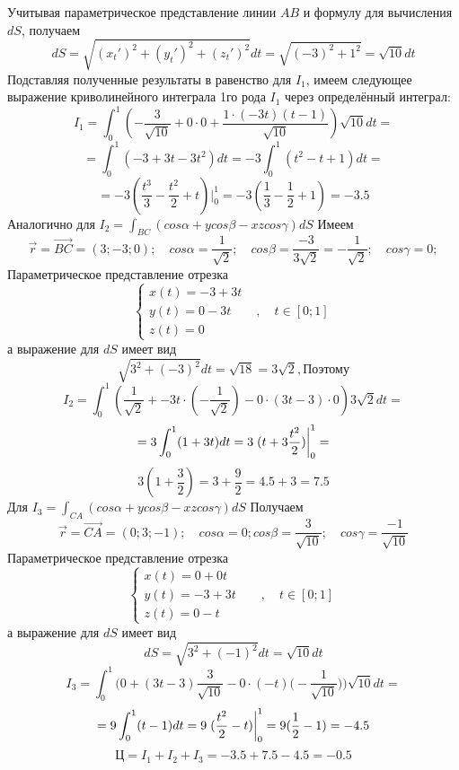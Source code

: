 \documentclass[11pt]{article}
\begin{document}
Учитывая параметрическое представление линии $AB$ и формулу для вычисления $dS$, получаем
\[dS = \sqrt{(x_t')^2 + (y_t')^2 + (z_t ')^2}dt = \sqrt{(-3)^2 + 1^2} = \sqrt{10}dt\]
Подставляя полученные результаты в равенство для $I_1$, имеем следующее выражение криволинейного интеграла 1го рода $I_1$ через определённый интеграл:
\[I_1 = \int_0^1(-\frac{3}{\sqrt{10}} + 0 \cdot 0 + \frac{1 \cdot(-3t)(t-1)}{\sqrt{10}})\sqrt{10}dt = \]
\[= \int_0^1 (-3 + 3t - 3t^2)dt = -3\int_0^1(t^2 - t + 1)dt =\]
\[= -3(\frac{t^3}{3} - \frac{t^2}{2} + t)\Big|_0^1 = -3 (\frac{1}{3} - \frac{1}{2} + 1) = -3.5\]
Аналогично для $I_2 = \int_{BC}(cos\alpha + y cos\beta - xzcos\gamma)dS$
Имеем 
\[\vec{r} = \vec{BC} = (3; -3; 0); \quad cos\alpha = \frac{1}{\sqrt{2}}; \quad cos\beta = \frac{-3}{3\sqrt{2}} = -\frac{1}{\sqrt{2}}; \quad cos\gamma = 0;\]
Параметрическое представление отрезка
\[
\begin{cases}
	x(t) = -3 + 3t \\
	y(t) = 0 - 3t \quad\quad , \quad t\in [0; 1] \\
	z(t) = 0
\end{cases}
\]
а выражение для $dS$ имеет вид
\[\sqrt{3^2 + (-3)^2}dt = \sqrt{18} = 3\sqrt{2}, \text{Поэтому}\]
\[I_2 = \int_0^1 (\frac{1}{\sqrt{2}}+ -3t\cdot(-\frac{1}{\sqrt{2}})- 0\cdot(3t - 3)\cdot 0)3\sqrt{2}dt = \]
\[= 3\int_0^1(1 + 3t)dt = 3\eval{(t + 3\frac{t^2}{2})}_0^1 = \]\[3(1 + \frac{3}{2}) = 3 + \frac{9}{2} = 4.5 + 3  = 7.5\]
Для $I_3 = \int_{CA}(cos\alpha + y cos\beta - xzcos\gamma)dS$ Получаем \[\vec{r} = \vec{CA} = (0;3;-1); \quad cos\alpha = 0; cos\beta = \frac{3}{\sqrt{10}}; \quad cos\gamma = \frac{-1}{\sqrt{10}}\]
Параметрическое представление отрезка
\[
\begin{cases}
	x(t) = 0 + 0t \\
	y(t) = -3 + 3t \quad\quad , \quad t\in [0; 1] \\
	z(t) = 0 - t
\end{cases}
\]
а выражение для $dS$ имеет вид
\[dS = \sqrt{3^2 + (-1)^2}dt = \sqrt{10}dt\]
\[I_3 = \int_0^1\Big(0 + (3t-3)\frac{3}{\sqrt{10}} - 0\cdot(-t)\big(-\frac{1}{\sqrt{10}}\big)\Big)\sqrt{10}dt = \]
\[= 9\int_0^1(t-1)dt = 9\eval{(\frac{t^2}{2} - t)}_0^1 = 9(\frac{1}{2} - 1) = -4.5\]
\[\text{Ц} = I_1 + I_2 + I_3 = -3.5 + 7.5 - 4.5 = -0.5\]
\end{document}

